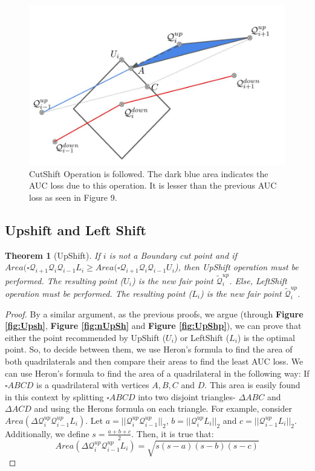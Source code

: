 \documentclass{article}
\newtheorem{theorem}{Theorem}[section]
\begin{document}
\begin{figure}[!h]
    \centering
    \includegraphics[scale =0.2]{diagrams/cut_proof1.jpg}
    \caption{CutShift Operation is followed. The dark blue area indicates the AUC loss due to this operation. It is lesser than the previous AUC loss as seen in Figure 9.}
    \label{fig:c2}
\end{figure}


\subsection{Upshift and Left Shift}
\begin{theorem}[UpShift]
    If $i$ is not a Boundary cut point and if $Area(\square \mathcal{Q}_{i+1}\mathcal{Q}_{i}\mathcal{Q}_{i-1}{L}_i \ge Area(\square \mathcal{Q}_{i+1}\mathcal{Q}_{i}\mathcal{Q}_{i-1}{U}_i$), then UpShift operation must be performed. The resulting point ($U_i$) is the new fair point $\mathcal{\widetilde{Q}}_i^{up}$. Else, LeftShift operation must be performed. The resulting point ($L_i$) is the new fair point $\mathcal{\widetilde{Q}}_i^{up}$.
\end{theorem}


\begin{proof}
    By a similar argument, as the previous proofs, we argue (through \textbf{Figure \ref{fig:Upsh}}, \textbf{Figure \ref{fig:nUpSh}} and \textbf{Figure \ref{fig:UpShp}}), we can prove that either the point recommended by UpShift ($U_i$) or LeftShift ($L_i$) is the optimal point. So, to decide between them, we use Heron's formula to find the area of both quadrilaterals and then compare their areas to find the least AUC loss. We can use Heron's formula to find the area of a quadrilateral in the following way: If $\square ABCD$ is a quadrilateral with vertices $A,B,C$ and $D$. This area is easily found in this context by splitting $\square ABCD$ into two disjoint triangles- $\Delta ABC$ and $\Delta ACD$ and using the Herons formula \cite{kendig20002000} on each triangle. For example, consider $Area(\Delta \mathcal{Q}_i^{up} \mathcal{Q}_{i-1}^{up} L_i)$. Let $a = ||\mathcal{Q}_i^{up} \mathcal{Q}_{i-1}^{up}||_2$, $b = ||\mathcal{Q}_i^{up} L_i||_2$ and $c = ||\mathcal{Q}_{i-1}^{up} L_i||_2$. Additionally, we define $s = \frac{a+b+c}{2}$. Then, it is true that:
\[Area(\Delta \mathcal{Q}_i^{up} \mathcal{Q}_{i-1}^{up} L_i ) = \sqrt{s(s-a)(s-b)(s-c)}\]

\end{proof}
\end{document}
